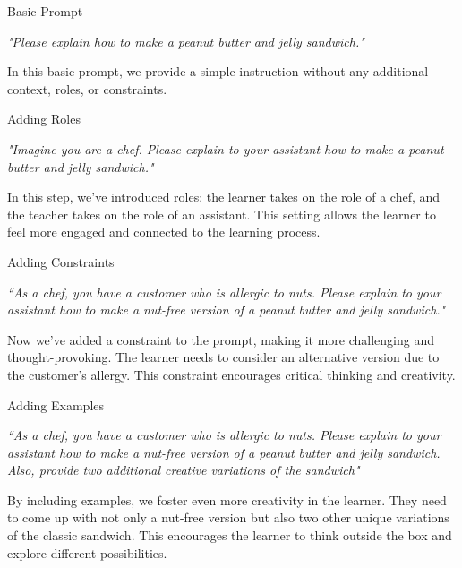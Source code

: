 \begin{frame}[plain]
\centering
{\Huge Basic Prompt}

\vspace{2em}
{\Large \em "Please explain how to make a peanut butter and jelly sandwich."}

\vspace{2em}
In this basic prompt, we provide a simple instruction without any additional context, roles, or constraints.
\end{frame}

\begin{frame}[plain]
\centering
{\Huge Adding Roles}

\vspace{2em}
{\Large \em "Imagine you are a chef. Please explain to your assistant how to make a peanut butter and jelly sandwich."}

\vspace{2em}
In this step, we've introduced roles: the learner takes on the role of a chef, and the teacher takes on the role of an assistant. This setting allows the learner to feel more engaged and connected to the learning process.
\end{frame}


\begin{frame}[plain]
\centering
{\Huge Adding Constraints}

\vspace{2em}
{\Large \em ``As a chef, you have a customer who is allergic to nuts. Please explain to your assistant how to make a nut-free version of a peanut butter and jelly sandwich."}

\vspace{2em}
Now we've added a constraint to the prompt, making it more challenging and thought-provoking. The learner needs to consider an alternative version due to the customer's allergy. This constraint encourages critical thinking and creativity.
\end{frame}


\begin{frame}[plain]
\centering
{\Huge Adding Examples}

\vspace{2em}
{\Large \em ``As a chef, you have a customer who is allergic to nuts. Please explain to your assistant how to make a nut-free version of a peanut butter and jelly sandwich. Also, provide two additional creative variations of the sandwich"}

\vspace{2em}
By including examples, we foster even more creativity in the learner. They need to come up with not only a nut-free version but also two other unique variations of the classic sandwich. This encourages the learner to think outside the box and explore different possibilities.
\end{frame}


